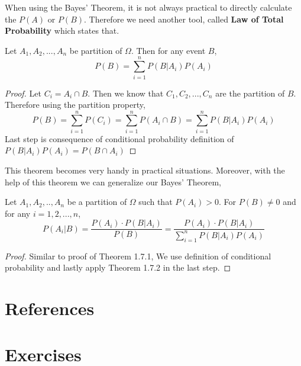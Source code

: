 \par 

When using the Bayes' Theorem, it is not always practical to directly calculate the $P(A)$ or $P(B)$. Therefore we need another tool, called \textbf{Law of Total Probability} which states that.
\\
\begin{theorem} Let $A_1,A_2,...,A_n$ be partition of $\Omega$. Then for any event $B$,
    $$P(B)= \sum_{i=1}^n P(B|A_i)P(A_i)$$
    
\end{theorem}
\begin{proof}
    Let $C_i=A_i \cap B$. Then we know that $C_1,C_2,...,C_n$ are the partition of $B$. Therefore using the partition property,
    $$ P(B)= \sum_{i=1}^n P(C_i) = \sum_{i=1}^n P(A_i \cap B) =\sum_{i=1}^n P(B|A_i)P(A_i) $$
    Last step is consequence of conditional probability definition of $P(B|A_i)P(A_i)=P(B \cap A_i)$
\end{proof}

\par
This theorem becomes very handy in practical situations. Moreover, with the help of this theorem we can generalize our Bayes' Theorem,

\begin{theorem} Let $A_1,A_2,..,A_n$ be a partition of $\Omega$ such that $P(A_i) > 0$. For $P(B) \neq 0$ and for any $i=1,2,...,n$,
    $$ P(A_i|B) = \frac{P(A_i) \cdot P(B|A_i)}{P(B)} =  \frac{P(A_i) \cdot P(B|A_i)}{\sum_{i=1}^n P(B|A_i)P(A_i) }$$
\end{theorem}
\begin{proof}
    Similar to proof of Theorem 1.7.1, We use definition of conditional probability and  lastly apply Theorem 1.7.2  in the last step.
\end{proof}
\section{References}
\section{Exercises}




